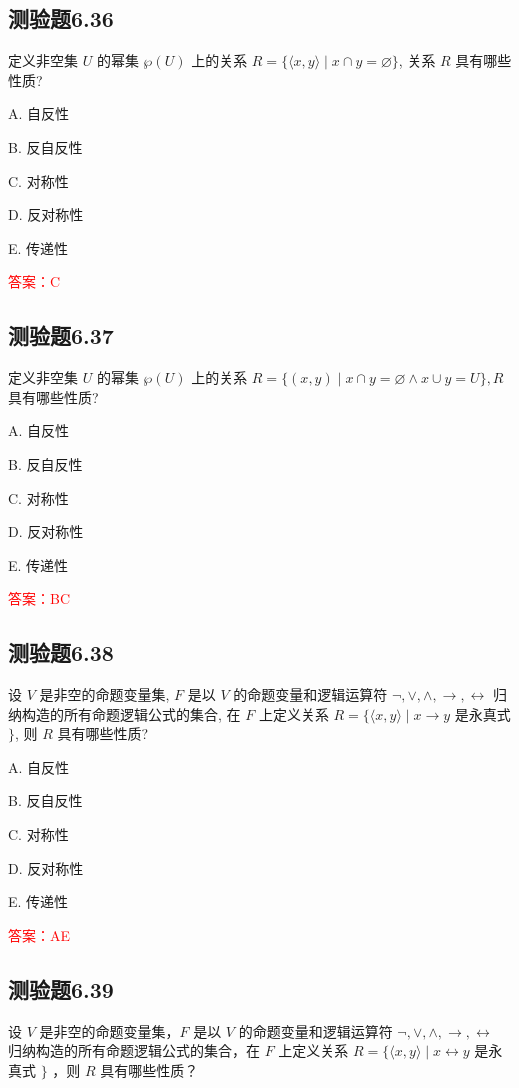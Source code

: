 \documentclass[UTF8, heading=true]{ctexart}
\begin{document}
\subsection{测验题6.36}
定义非空集 $U$ 的幂集 $\wp(U)$ 上的关系 $R=\{\langle x, y\rangle \mid x \cap y=\varnothing\}$, 关系 $R$ 具有哪些性质?

A. 
自反性

B. 
反自反性

C. 
对称性

D. 
反对称性

E. 
传递性

\textcolor{red}{答案：C}

\subsection{测验题6.37}
定义非空集 $U$ 的幂集 $\wp(U)$ 上的关系 $R=\{(x, y) \mid x \cap y=\varnothing \wedge x \cup y=U\}, R$ 具有哪些性质?

A. 
自反性

B. 
反自反性

C. 
对称性

D. 
反对称性

E. 
传递性

\textcolor{red}{答案：BC}

\subsection{测验题6.38}

设 $V$ 是非空的命题变量集, $F$ 是以 $V$ 的命题变量和逻辑运算符 $\neg, \vee, \wedge, \rightarrow, \leftrightarrow$ 归纳构造的所有命题逻辑公式的集合, 在 $F$ 上定义关系 $R=\{\langle x, y\rangle \mid x \rightarrow y$ 是永真式 $\}$, 则 $R$ 具有哪些性质?

A. 自反性

B. 反自反性

C. 对称性

D. 反对称性

E. 传递性

\textcolor{red}{答案：AE}

\subsection{测验题6.39}


设 $V$ 是非空的命题变量集，$F$ 是以 $V$ 的命题变量和逻辑运算符 $\neg, \vee, \wedge, \rightarrow, \leftrightarrow$ 归纳构造的所有命题逻辑公式的集合，在 $F$ 上定义关系 $R=\{\langle x, y\rangle \mid x \leftrightarrow y$ 是永真式 $\}$ ，则 $R$ 具有哪些性质？
\end{document}
